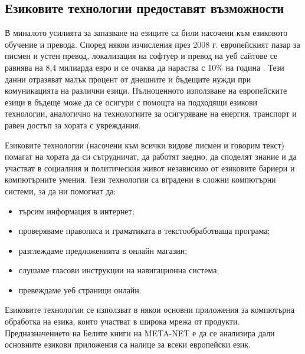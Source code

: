 \begin{multicols}{2}

  \subsection{Езиковите технологии предоставят възможности}

  В миналото усилията за запазване на езиците са били насочени
   към езиковото обучение и превода. Според някои
   изчисления през 2008 г. европейският пазар за писмен и
   устен превод, локализация на софтуер и превод на
   уеб сайтове се равнява на 8,4 милиарда евро и се
   очаква да нараства с 10\% на година \cite{EC3}. Тези данни отразяват малък процент от днешните и бъдещите нужди при комуникацията на различни езици.
  Пълноценното използване на европейските езици в бъдеще може да се осигури с помощта на подходящи езикови технологии, аналогично на технологиите за осигуряване  на енергия, транспорт и равен достъп за хората с увреждания.  

  Езиковите технологии (насочени към всички видове писмен и говорим текст) помагат на хората да си сътрудничат, да работят заедно, да споделят знание и да участват в социалния и
   политическия живот независимо от езиковите бариери и компютърните умения. Тези технологии са вградени в сложни компютърни системи, за да ни помогнат да:

  \begin{itemize}
  \item търсим информация в интернет;
  \item проверяваме правописа и граматиката в текстообработваща програма;
  \item разглеждаме предложенията в онлайн магазин;
  \item слушаме гласови инструкции на навигационна система;
  \item превеждаме уеб страници онлайн.
  \end{itemize}

  Езиковите технологии се използват в някои основни приложения за компютърна обработка на езика, които участват в широка мрежа от продукти. Предназначението на Белите книги на META-NET е да се анализира дали основните езикови приложения са налице за всеки европейски език.



\end{multicols}
